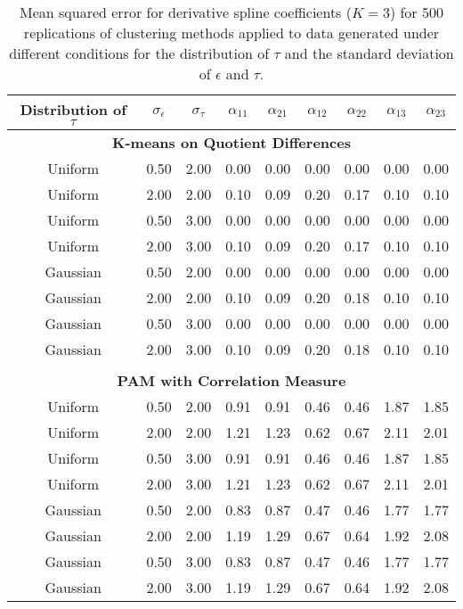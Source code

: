 \documentclass[12pt]{article}
\begin{document}
\begin{table}[ht]
\begin{center}
\begin{tabular}{ccc|cccccc}
  \hline Distribution of $\tau$&$\sigma_{\epsilon}$&$\sigma_{\tau}$&$\alpha_{11}$&$\alpha_{21}$&$\alpha_{12}$&$\alpha_{22}$&$\alpha_{13}$&$\alpha_{23}$\\  \hline\multicolumn{9}{c}{\textbf{K-means on Quotient Differences}}\\ Uniform & 0.50 & 2.00 & 0.00 & 0.00 & 0.00 & 0.00 & 0.00 & 0.00 \\ 
  Uniform & 2.00 & 2.00 & 0.10 & 0.09 & 0.20 & 0.17 & 0.10 & 0.10 \\ 
  Uniform & 0.50 & 3.00 & 0.00 & 0.00 & 0.00 & 0.00 & 0.00 & 0.00 \\ 
  Uniform & 2.00 & 3.00 & 0.10 & 0.09 & 0.20 & 0.17 & 0.10 & 0.10 \\ 
  Gaussian & 0.50 & 2.00 & 0.00 & 0.00 & 0.00 & 0.00 & 0.00 & 0.00 \\ 
  Gaussian & 2.00 & 2.00 & 0.10 & 0.09 & 0.20 & 0.18 & 0.10 & 0.10 \\ 
  Gaussian & 0.50 & 3.00 & 0.00 & 0.00 & 0.00 & 0.00 & 0.00 & 0.00 \\ 
  Gaussian & 2.00 & 3.00 & 0.10 & 0.09 & 0.20 & 0.18 & 0.10 & 0.10 \\ 
   \\ \multicolumn{9}{c}{\textbf{PAM with Correlation Measure}}\\Uniform & 0.50 & 2.00 & 0.91 & 0.91 & 0.46 & 0.46 & 1.87 & 1.85 \\ 
  Uniform & 2.00 & 2.00 & 1.21 & 1.23 & 0.62 & 0.67 & 2.11 & 2.01 \\ 
  Uniform & 0.50 & 3.00 & 0.91 & 0.91 & 0.46 & 0.46 & 1.87 & 1.85 \\ 
  Uniform & 2.00 & 3.00 & 1.21 & 1.23 & 0.62 & 0.67 & 2.11 & 2.01 \\ 
  Gaussian & 0.50 & 2.00 & 0.83 & 0.87 & 0.47 & 0.46 & 1.77 & 1.77 \\ 
  Gaussian & 2.00 & 2.00 & 1.19 & 1.29 & 0.67 & 0.64 & 1.92 & 2.08 \\ 
  Gaussian & 0.50 & 3.00 & 0.83 & 0.87 & 0.47 & 0.46 & 1.77 & 1.77 \\ 
  Gaussian & 2.00 & 3.00 & 1.19 & 1.29 & 0.67 & 0.64 & 1.92 & 2.08 \\ 
   \hline\end{tabular}
\caption{Mean squared error for derivative spline coefficients ($K=3$) for 500 replications of clustering methods applied to data generated under different conditions for the distribution of $\tau$ and the standard deviation of $\epsilon$ and $\tau$.}
\label{tab:mse2}
\end{center}
\end{table}
\end{document}
